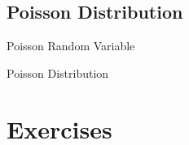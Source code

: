 \subsection{Poisson Distribution}

\begin{frame}{Poisson Random Variable}



\end{frame}

\begin{frame}{Poisson Distribution}



\end{frame}

\section{Exercises}


